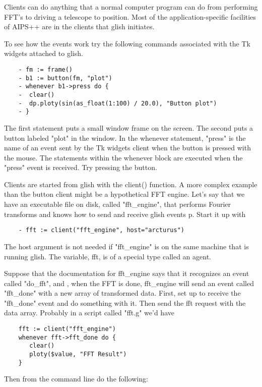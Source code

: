     Clients can do anything that a normal computer program can do from
performing FFT's to driving a telescope to position.  Most of the
application-specific facilities of AIPS++ are in the clients that glish
initiates.

    To see how the events work try the following commands associated with
the Tk widgets attached to glish.

\begin{verbatim}
	- fm := frame()
	- b1 := button(fm, "plot")
	- whenever b1->press do {
	-  clear()
	-  dp.ploty(sin(as_float(1:100) / 20.0), "Button plot")
	- }
\end{verbatim}

The first statement puts a small window frame on the screen.  The second
puts a button labeled "plot" in the window.  In the whenever statement,
"press" is the name of an event sent by the Tk widgets client when the
button is pressed with the mouse.  The statements within the whenever block
are executed when the "press" event is received.  Try pressing the button.

    Clients are started from glish with the client() function.  A more
complex example than the button client might be a hypothetical FFT engine.
Let's say that we have an executable file on disk, called "fft\_engine",
that performs Fourier transforms and knows how to send and receive glish
events p.  Start it up with

\begin{verbatim}
	- fft := client("fft_engine", host="arcturus")
\end{verbatim}

The host argument is not needed if "fft\_engine" is on the same machine that
is running glish.  The variable, fft, is of a special type called an agent.

    Suppose that the documentation for fft\_engine says that it recognizes
an event called "do\_fft", and , when the FFT is done, fft\_engine will send
an event called "fft\_done" with a new array of transformed data.  First,
set up to receive the "fft\_done" event and do something with it.  Then send
the fft request with the data array.  Probably in a script called "fft.g"
we'd have

\begin{verbatim}
	fft := client("fft_engine")
	whenever fft->fft_done do {
	   clear()
	   ploty($value, "FFT Result")
	}
\end{verbatim}

Then from the command line do the following:

